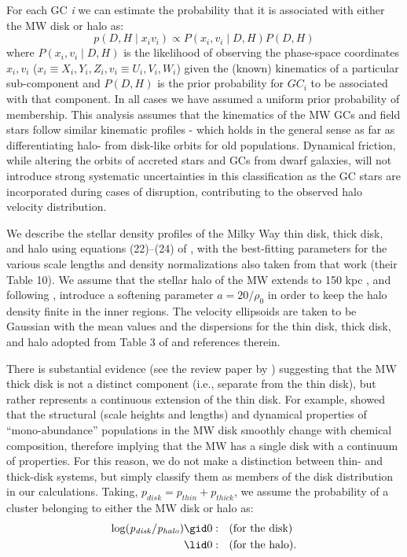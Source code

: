 \documentclass[useAMS,usenatbib]{mn2e}
\begin{document}
For each GC \emph{i} we can estimate the probability that it 
is associated with either the MW disk or halo as:
\begin{equation}
p(D,H{\mid} x_{i} v_{i}) \propto P(x_{i},v_{i}{\mid} D,H)P(D,H)
\end{equation}
where $P(x_{i},v_{i}{\mid}D,H)$ is the likelihood of observing the
phase-space coordinates $x_{i}, v_{i}$ ($x_{i} \equiv X_{i},Y_{i},Z_{i} , 
v_{i} \equiv U_{i},V_{i},W_{i }$) given the (known) kinematics 
of a particular sub-component and $P(D,H)$ is the prior probability 
for $GC_{i}$ to be associated with that component.  
In all cases we have assumed a uniform prior probability of membership. 
This analysis assumes that the kinematics of the MW GCs and 
field stars follow similar kinematic profiles - which holds in the 
general sense as far as differentiating halo- from disk-like orbits
for old populations. Dynamical friction, while altering the orbits of
accreted stars and GCs from dwarf galaxies, will not introduce
strong systematic uncertainties in this classification as the GC stars
are incorporated during cases of disruption,
contributing to the observed halo velocity distribution.

We describe the stellar density profiles of the Milky Way 
thin disk, thick disk, and halo using equations (22)--(24) 
of \cite{Juric08}, with the
best-fitting parameters for the various scale lengths and density normalizations
also taken from that work (their Table 10).  We assume that the stellar halo of the
MW extends to 150 kpc \citep{Deason12}, and following \cite{Pritzl05}, 
introduce a softening parameter $a = 20/\rho_{0}$ in order to keep the halo
density finite in the inner regions.  The velocity ellipsoids are taken to
be Gaussian with the mean values and the dispersions for the thin disk, thick
disk, and halo adopted from Table 3 of \cite{Venn04} and references therein.

There is substantial evidence (see the review paper by \citealt{RB13}) suggesting
 that the MW thick disk is not a distinct component (i.e., separate
from the thin disk), but rather represents a continuous extension of the thin
disk.  For example, \cite{Bovy12a, Bovy12b} showed that the structural (scale
heights and lengths) and dynamical properties of ``mono-abundance'' populations
in the MW disk smoothly change with chemical composition, therefore implying
that the MW has a single disk with a continuum of properties.  For this
reason, we do not make a distinction between thin- and thick-disk systems, but
simply classify them as members of the disk distribution in our calculations.
Taking, $p_{disk} = p_{thin} + p_{thick}$, we assume the probability of a
cluster belonging to either the MW disk or halo as:
\begin{align}\nonumber
{\rm log}( \it{p_{disk}}/\it{p_{halo}})&\gid 0:~  \mbox{ (for the disk)}\\
&\lid 0:~  \mbox{ (for the halo).}
\end{align}
\end{document}
